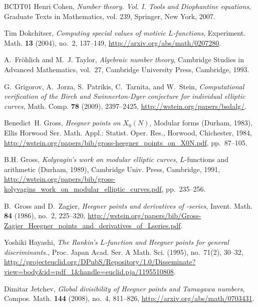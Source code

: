 \documentclass[preprint,12pt]{elsarticle}
\theoremstyle{plain}
\theoremstyle{definition}
\begin{document}
\begin{thebibliography}{BCDT01}
Henri Cohen, \emph{Number theory. {V}ol. {I}. {T}ools and {D}iophantine
  equations}, Graduate Texts in Mathematics, vol. 239, Springer, New York,
  2007. 

Tim Dokchitser, \emph{Computing special values of motivic {$L$}-functions},
  Experiment. Math. \textbf{13} (2004), no.~2, 137--149,
  \url{http://arxiv.org/abs/math/0207280}. 

A.~Fr{\"o}hlich and M.~J. Taylor, \emph{Algebraic number theory}, Cambridge
  Studies in Advanced Mathematics, vol.~27, Cambridge University Press,
  Cambridge, 1993. 

G.~Grigorov, A.~Jorza, S.~Patrikis, C.~Tarnita, and W.~Stein,
  \emph{Computational verification of the {B}irch and {S}winnerton-{D}yer
  conjecture for individual elliptic curves}, Math. Comp. \textbf{78} (2009),
  2397--2425, \url{http://wstein.org/papers/bsdalg/}.

Benedict~H. Gross, \emph{Heegner points on {$X_0(N)$}}, Modular forms
  ({D}urham, 1983), Ellis Horwood Ser. Math. Appl.: Statist. Oper. Res.,
  Horwood, Chichester, 1984,
  \url{http://wstein.org/papers/bib/gross-heegner_points_on_X0N.pdf},
  pp.~87--105. 

B.\thinspace{}H. Gross, \emph{Kolyvagin's work on modular elliptic curves},
  {$L$}-functions and arithmetic (Durham, 1989), Cambridge Univ. Press,
  Cambridge, 1991,
  \url{http://wstein.org/papers/bib/gross-kolyvagins_work_on_modular_elliptic_curves.pdf},
  pp.~235--256.

B.~Gross and D.~Zagier, \emph{Heegner points and derivatives of
  -series}, Invent. Math. \textbf{84} (1986), no.~2, 225--320,
  \url{http://wstein.org/papers/bib/Gross-Zagier_Heegner_points_and_derivatives_of_Lseries.pdf}.

Yoshiki Hayashi, \emph{The {R}ankin’s {$L$}-function and {H}eegner points for
  general discriminants.}, Proc. Japan Acad. Ser. A Math. Sci. (1995),
  no.~71(2), 30--32,
  \url{http://projecteuclid.org/DPubS/Repository/1.0/Disseminate?view=body&id=pdf_1&handle=euclid.pja/1195510808}.

Dimitar Jetchev, \emph{Global divisibility of {H}eegner points and {T}amagawa
  numbers}, Compos. Math. \textbf{144} (2008), no.~4, 811--826,
  \url{http://arxiv.org/abs/math/0703431}. 


\end{thebibliography}
\end{document}
